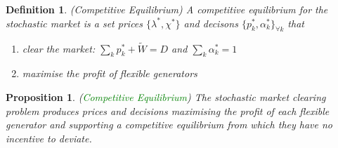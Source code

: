 \documentclass{article}
\newtheorem{proposition}{Proposition}
\newtheorem{definition}{Definition}
\begin{document}
\begin{definition}
(Competitive Equilibrium) A competitive equilibrium for the stochastic market is a set prices $\{\lambda^*, \chi^*\}$ and decisons $\{p_k^*, \alpha_k^*\}_{\forall k}$ that\vspace{-5pt}
\begin{enumerate}
\item clear the market: $\sum_k p_k^* + \tilde{W} = D$ and $\sum_k \alpha_k^* = 1$\vspace{-5pt}
\item maximise the profit of flexible generators
\end{enumerate}
\end{definition}

\begin{proposition}
(\textcolor{green}{Competitive Equilibrium}) The stochastic market clearing problem produces prices and decisions maximising the profit of each flexible generator and supporting a competitive equilibrium from which they have no incentive to deviate.
\end{proposition}
\end{document}
